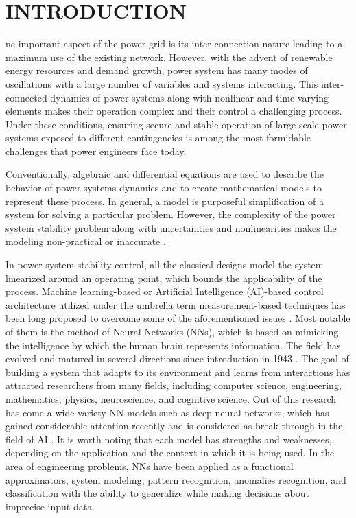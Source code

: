 \documentclass[journal]{IEEEtran}
\begin{document}
\section{INTRODUCTION}
ne important aspect of the power grid is its inter-connection nature leading to a maximum use of the existing network. However, with the advent of renewable energy resources and demand growth, power system has many modes of oscillations with a large number of variables and systems interacting. This inter-connected dynamics of power systems along with nonlinear and time-varying elements makes their operation complex and their control a challenging process. Under these conditions, ensuring secure and stable operation of large scale power systems exposed to different contingencies is among the most formidable challenges that power engineers face today. 

Conventionally, algebraic and differential equations are used to describe the behavior of power systems dynamics and to create mathematical models to represent these process. In general, a model is  purposeful simplification of a system for solving a particular problem. However, the complexity of the power system stability problem along with uncertainties and nonlinearities makes the modeling non-practical or inaccurate \cite{vu2014lyapunov}. 


In power system stability control, all the classical designs model the system linearized around an operating point, which bounds the applicability of the process. Machine learning-based or Artificial Intelligence (AI)-based control architecture utilized under the umbrella term measurement-based techniques has been long proposed to overcome some of the aforementioned issues \cite{Sutton1998}. Most notable of them is the method of Neural Networks (NNs), which is based on mimicking the intelligence by which the human brain represents information. The field has evolved and matured in several directions since introduction in 1943 \cite{mcculloch1943logical}. The goal of building a system that adapts to its environment and learns from interactions has attracted researchers from many fields, including computer science, engineering, mathematics, physics, neuroscience, and cognitive science. Out of this research has come a wide variety NN models such as deep neural networks, which has gained considerable attention recently and is considered as break through in the field of AI \cite{DNN}. It is worth noting that each model has strengths and weaknesses, depending on the application and the context in which it is being used. In the area of engineering problems, NNs have been applied as a functional approximators, system modeling, pattern recognition, anomalies recognition, and classification with the ability to generalize while making decisions about imprecise input data. 
\end{document}
